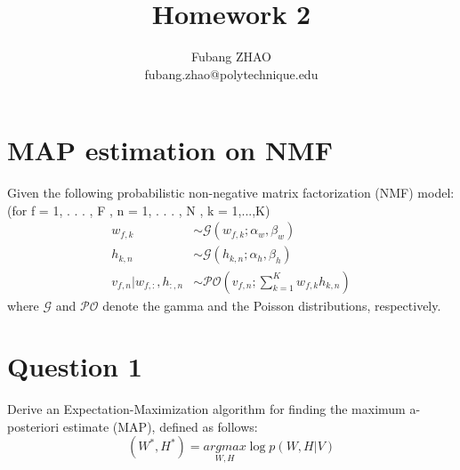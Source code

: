 \documentclass[12pt]{article}
\begin{document}
 
\title{\textbf{Homework 2}}
\author{Fubang ZHAO\\ 
fubang.zhao@polytechnique.edu}
 
\maketitle

\section*{MAP estimation on NMF}
Given the following probabilistic non-negative matrix factorization (NMF) model: (for f = 1, . . . , F , n = 1, . . . , N , k = 1,...,K)
\begin{align*}
w_{f,k} & \sim \mathcal{G} (w_{f,k};\alpha_w, \beta_w ) \\
h_{k,n} & \sim \mathcal{G} (h_{k,n}; \alpha_h, \beta_h ) \\
v_{f,n}|w_{f,:},h_{:,n} &\sim \mathcal{PO} (v_{f,n}; \sum_{k=1}^K{w_{f,k} h_{k,n}})
\end{align*}
where $\mathcal{G}$ and $\mathcal{PO}$ denote the gamma and the Poisson distributions, respectively.

\section*{Question 1}
Derive an Expectation-Maximization algorithm for finding the maximum a-posteriori estimate (MAP), defined as follows:
\begin{equation}
(W^*, H^*) = \underset{W,H}{argmax} \log p(W, H|V)
\end{equation}
\end{document}
